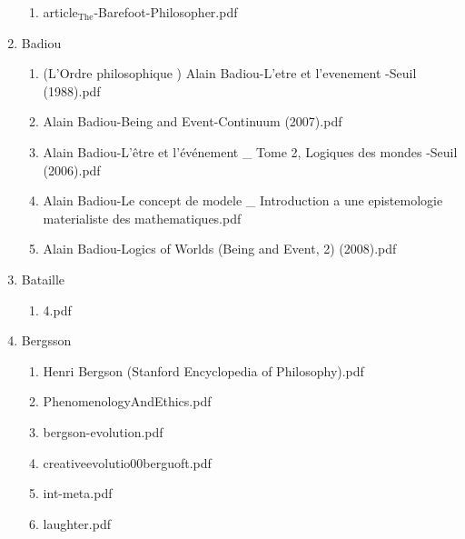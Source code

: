 \documentclass[11pt]{article}
\begin{document}
\begin{enumerate}
\begin{enumerate}
\item article$_{\text{The}}$-Barefoot-Philosopher.pdf
\label{sec-1-1-1-1-34-27-8}
\end{enumerate}

\item Badiou
\label{sec-1-1-1-1-34-28}
\begin{enumerate}
\item (L'Ordre philosophique ) Alain Badiou-L'etre et l'evenement -Seuil (1988).pdf
\label{sec-1-1-1-1-34-28-1}

\item Alain Badiou-Being and Event-Continuum (2007).pdf
\label{sec-1-1-1-1-34-28-2}

\item Alain Badiou-L'être et l'événement \_ Tome 2, Logiques des mondes  -Seuil (2006).pdf
\label{sec-1-1-1-1-34-28-3}

\item Alain Badiou-Le concept de modele \_ Introduction a une epistemologie materialiste des mathematiques.pdf
\label{sec-1-1-1-1-34-28-4}

\item Alain Badiou-Logics of Worlds (Being and Event, 2) (2008).pdf
\label{sec-1-1-1-1-34-28-5}
\end{enumerate}

\item Bataille
\label{sec-1-1-1-1-34-29}
\begin{enumerate}
\item 4.pdf
\label{sec-1-1-1-1-34-29-1}
\end{enumerate}

\item Bergsson
\label{sec-1-1-1-1-34-30}
\begin{enumerate}
\item Henri Bergson (Stanford Encyclopedia of Philosophy).pdf
\label{sec-1-1-1-1-34-30-1}

\item PhenomenologyAndEthics.pdf
\label{sec-1-1-1-1-34-30-2}

\item bergson-evolution.pdf
\label{sec-1-1-1-1-34-30-3}

\item creativeevolutio00berguoft.pdf
\label{sec-1-1-1-1-34-30-4}

\item int-meta.pdf
\label{sec-1-1-1-1-34-30-5}

\item laughter.pdf
\label{sec-1-1-1-1-34-30-6}


\end{enumerate}
\end{enumerate}
\end{document}
